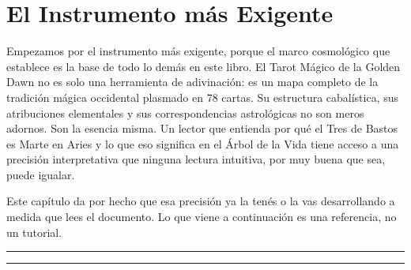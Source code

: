 \section{El Instrumento más Exigente}\label{before-chapter-one-the-golden-dawn-magical-tarot}

Empezamos por el instrumento más exigente, porque el marco cosmológico que establece es la base de todo lo demás en este libro. El Tarot Mágico de la Golden Dawn no es solo una herramienta de adivinación: es un mapa completo de la tradición mágica occidental plasmado en 78 cartas. Su estructura cabalística, sus atribuciones elementales y sus correspondencias astrológicas no son meros adornos. Son la esencia misma. Un lector que entienda por qué el Tres de Bastos es Marte en Aries y lo que eso significa en el Árbol de la Vida tiene acceso a una precisión interpretativa que ninguna lectura intuitiva, por muy buena que sea, puede igualar.

Este capítulo da por hecho que esa precisión ya la tenés o la vas desarrollando a medida que lees el documento. Lo que viene a continuación es una referencia, no un tutorial.

\begin{center}\rule{0.5\linewidth}{0.5pt}\end{center}

\begin{center}\rule{0.5\linewidth}{0.5pt}\end{center}
